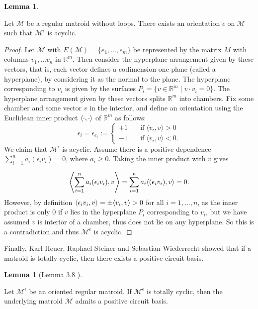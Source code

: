 \documentclass[12pt]{report}
\theoremstyle{definition}
\newtheorem{lemma}[theorem]{Lemma}
\DeclarePairedDelimiter\iprod{\langle}{\rangle}
\def\R{\mathbb R}
\def\calM{\mathcal M}
\theoremstyle{upright}
\begin{document}
\begin{lemma}\label{lem:AcyclicMatroid}

    Let $\calM$ be a regular matroid without loops.
    There exists an orientation $\epsilon$ on $\calM$ such that $\calM^\epsilon$ is acyclic.
    
\end{lemma}

\begin{proof}

    Let $\calM$ with $E(\calM)=\{e_1,\ldots, e_m\}$ be represented by the matrix $M$
    with columns $v_1, \dots v_n$ in $\R^m$.
    Then consider the hyperplane arrangement given by these vectors, that is, each vector defines a codimension one plane (called a hyperplane), by considering it as the normal to the plane.
    The hyperplane corresponding to $v_i$ is given by the surfaces $P_i=\{v\in\R^m\;|\;v\cdot v_i=0\}$.
    The hyperplane arrangement given by these vectors splits $\R^m$ into chambers.
    Fix some chamber and some vector $v$ in the interior, and define an orientation using the Euclidean inner product $\iprod*{\cdot, \cdot}$ of $\R^m$ as follows:
    \[\epsilon_i=\epsilon_{e_i}:=\begin{cases}
        +1\quad&\text{if}\;\langle v_i,v\rangle>0\\
        -1\quad&\text{if} \; \langle v_i,v\rangle<0.
    \end{cases}\]
    We claim that $\calM^\epsilon$ is acyclic.
    Assume there is a positive dependence $\sum_{i=1}^n a_i (\epsilon_i v_i)=0$, where $a_i\geq0$.
    Taking the inner product with $v$ gives
    
    \[\iprod*{\sum_{i=1}^n a_i (\epsilon_i v_i), v}=\sum_{i=1}^n a_i \iprod*{(\epsilon_i v_i), v}=0.\]
    However, by definition $\iprod*{\epsilon_i v_i, v}=\pm\iprod*{v_i, v}>0$ for all $i=1, \dots, n$, as the inner product is only $0$ if $v$ lies in the hyperplane $P_i$ corresponding to $v_i$, but we have assumed $v$ is interior of a chamber, thus does not lie on any hyperplane.
    So this is a contradiction and thus $\calM^\epsilon$ is acyclic.

\end{proof}

Finally, Karl Heuer, Raphael Steiner and Sebastian Wiederrecht \cite{heuer2022even} showed that if a matroid is totally cyclic, then there exists a positive circuit basis.

\begin{lemma}[Lemma 3.8 \cite{heuer2022even}]\label{lem:PosMatroidBasis}

    Let $\calM^\epsilon$ be an oriented regular matroid.
    If $\calM^\epsilon$ is totally cyclic, then the underlying matroid $\calM$ admits a positive circuit basis. 

\end{lemma}
\end{document}

